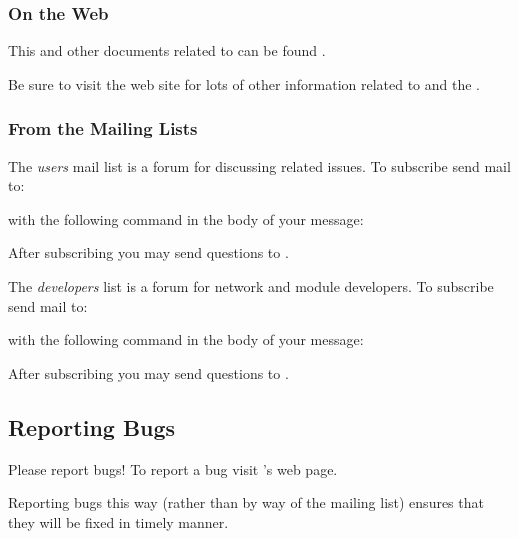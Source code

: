 \subsubsection{On the Web}

This and other documents related to \sr{} can be found 
.

Be sure to visit the \sci{} web site for lots of other
information related to \sr{} and the \scii{}.

\subsubsection{From the Mailing Lists}

The \sr{} \emph{users} mail list is a forum for discussing \sr{}
related issues.  To subscribe send mail to:


with the following command in the body of your message:


After subscribing you may send questions to
.

The \sr{} \emph{developers} list is a forum for network and module
developers.  To subscribe send mail to:


with the following command in the body of your message:


After subscribing you may send questions to
.

\subsection{Reporting Bugs}
\label{sec:bugs}

Please report bugs!  To report a bug visit \sr{}'s
 web page.

Reporting bugs this way (rather than by way of the mailing list) ensures
that they will be fixed in timely manner.

